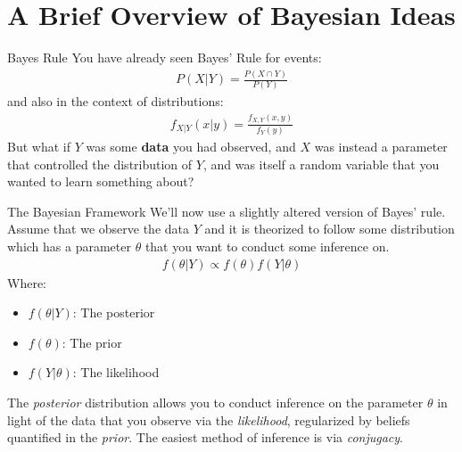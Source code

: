 \documentclass{beamer}
\begin{document}
\section{A Brief Overview of Bayesian Ideas}
\begin{frame}{Bayes Rule}
You have already seen Bayes' Rule for events:
\begin{align*}
P(X|Y) = \frac{P(X\cap Y)}{P(Y)}
\end{align*}
and also in the context of distributions:
\begin{align*}
f_{X|Y}(x|y) = \frac{f_{X, Y}(x,y)}{f_{Y}(y)}
\end{align*}
But what if $Y$ was some \textbf{data} you had observed, and $X$ was instead a parameter that controlled the distribution of $Y$, and was itself a random variable that you wanted to learn something about?
\end{frame}

\begin{frame}{The Bayesian Framework}
We'll now use a slightly altered version of Bayes' rule. Assume that we observe the data $Y$ and it is theorized to follow some distribution which has a parameter $\theta$ that you want to conduct some inference on. 
\begin{align*}
f(\theta|Y) \propto f(\theta)f(Y|\theta)
\end{align*}
Where:
\begin{itemize}
\item{$f(\theta|Y)$: The posterior}
\item{$f(\theta)$: The prior}
\item{$f(Y|\theta)$: The likelihood}
\end{itemize}
The \emph{posterior} distribution allows you to conduct inference on the parameter $\theta$ in light of the data that you observe via the \emph{likelihood}, regularized by beliefs quantified in the \emph{prior}. The easiest method of inference is via \emph{conjugacy}. 
\end{frame}
\end{document}
